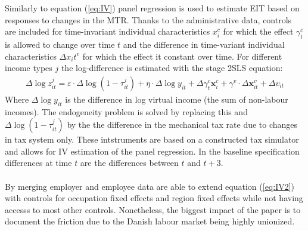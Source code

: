 Similarly to equation (\ref{eq:IV}) panel regression is used to estimate EIT based on responses to changes in the MTR. Thanks to the administrative data, controls are included for time-invariant individual characteristics $x_i^c$ for which the effect $\gamma_t^c$ is allowed to change over time $t$ and the difference in time-variant individual characteristics $\Delta x_it^v$ for which the effect it constant over time. For different income types $j$ the log-difference is estimated with the  stage 2SLS equation:
\begin{align}
  \Delta\log z_{it}^j = \varepsilon\cdot\Delta\log(1-\tau_{it}^j) + \eta\cdot\Delta\log y_{it} + \Delta\gamma_t^c \bm{x}_i^c + \gamma^v\cdot\Delta\bm{x}_{it}^v + \Delta v_{it}
  \label{eq:IV2}
\end{align}
Where $\Delta \log y_{it}$ is the difference in log virtual income (the sum of non-labour incomes). The endogeneity problem is solved by replacing this and $\Delta \log (1-\tau_{it}^j)$ by the the difference in the mechanical tax rate due to changes in tax system only. These intstruments are based on a constructed tax simulator and allows for IV estimation of the panel regression. In the baseline specification differences at time $t$ are the differences between $t$ and $t+3$.
\\
\\
By merging employer and employee data \citet{chetty2011adjustment} are able to extend equation (\ref{eq:IV2}) with controls for occupation fixed effects and region fixed effects while not having accesss to most other controls. Nonetheless, the biggest impact of the paper is to document the friction due to the Danish labour market being highly unionized.
